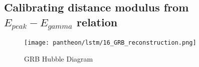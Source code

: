 \subsection{Calibrating distance modulus from $E_{peak}-E_{gamma}$ relation}
\begin{figure}[h]
	\centering
	\texttt{[image: pantheon/lstm/16\_GRB\_reconstruction.png]}
	\caption{GRB Hubble Diagram}
	\label{fig:HD_GRB_GP}
\end{figure}